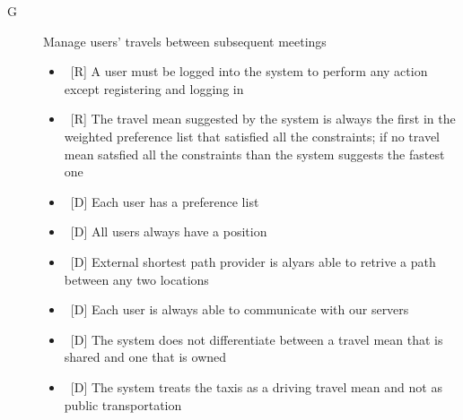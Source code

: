 \begin{description}
\item[G\thecount] Manage users’ travels between subsequent meetings

\begin{itemize}
\item~[R] A user must be logged into the system to perform any action except registering and logging in
\item~[R] The travel mean suggested by the system is always the first in the weighted preference list that satisfied all the constraints; if no travel mean satsfied all the constraints than the system suggests the fastest one
\end{itemize}

\begin{itemize}
\item~[D] Each user has a preference list
\item~[D] All users always have a position
\item~[D] External shortest path provider is alyars able to retrive a path between any two locations
\item~[D] Each user is always able to communicate with our servers
\item~[D] The system does not differentiate between a travel mean that is shared and one that is owned
\item~[D] The system treats the taxis as a driving travel mean and not as public transportation
\end{itemize}
\end{description}